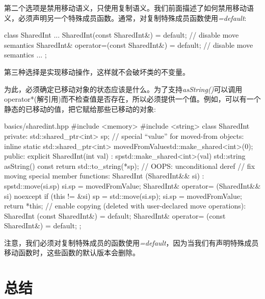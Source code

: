 
第二个选项是禁用移动语义，只使用复制语义。我们前面描述了如何禁用移动语义，必须声明另一个特殊成员函数。通常，对复制特殊成员函数使用\textit{=default}:\par

\begin{codebox}[cpp]
class SharedInt {
  ...
  SharedInt(const SharedInt&) = default; // disable move semantics
  SharedInt& operator=(const SharedInt&) = default; // disable move semantics
  ...
};
\end{codebox}


第三种选择是实现移动操作，这样就不会破坏类的不变量。\par

为此，必须确定已移动对象的状态应该是什么。为了支持\textit{asString()}可以调用operator*(解引用)而不检查值是否存在，所以必须提供一个值。例如，可以有一个静态的已移动的值，把它赋给那些已移动的对象:\par

\begin{codeboxt}[cpp]{basics/sharedint.hpp}
#include <memory>
#include <string>
class SharedInt {
  private:
  std::shared_ptr<int> sp;
  // special “value” for moved-from objects:
  inline static std::shared_ptr<int> movedFromValue{std::make_shared<int>(0)};
  public:
  explicit SharedInt(int val)
  : sp{std::make_shared<int>(val)} {
  }
  std::string asString() const {
    return std::to_string(*sp); // OOPS: unconditional deref
  }
  // fix moving special member functions:
  SharedInt (SharedInt&& si)
  : sp{std::move(si.sp)} {
    si.sp = movedFromValue;
  }
  SharedInt& operator= (SharedInt&& si) noexcept {
    if (this != &si) {
      sp = std::move(si.sp);
      si.sp = movedFromValue;
    }
    return *this;
  }
  // enable copying (deleted with user-declared move operations):
  SharedInt (const SharedInt&) = default;
  SharedInt& operator= (const SharedInt&) = default;
};
\end{codeboxt}

注意，我们必须对复制特殊成员的函数使用\textit{=default}，因为当我们有声明特殊成员移动函数时，这些函数的默认版本会删除。\par


\section{总结}

